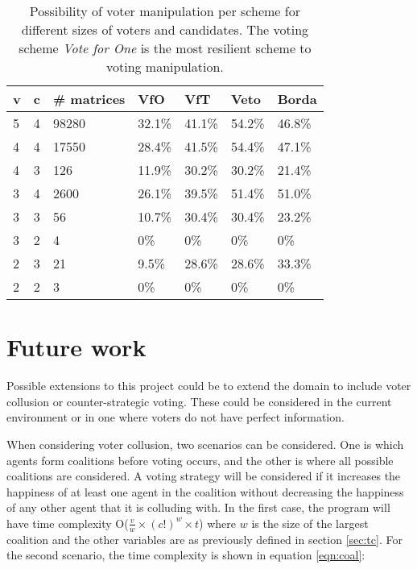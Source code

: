 \begin{table}[h]
\begin{tabular}{ll|lllll}
v & c  &  \# matrices & VfO  & VfT      & Veto   & Borda  \\
    \hline
5 & 4 & 98280 & 32.1\% & 41.1\% & 54.2\% & 46.8\% \\
4 & 4 & 17550 & 28.4\% & 41.5\% & 54.4\% & 47.1\% \\
4 & 3 & 126   & 11.9\% & 30.2\% & 30.2\% & 21.4\% \\
3 & 4 & 2600  & 26.1\% & 39.5\% & 51.4\% & 51.0\% \\
3 & 3 & 56    & 10.7\% & 30.4\% & 30.4\% & 23.2\% \\
3 & 2 & 4     & 0\%    & 0\%    & 0\%    & 0\%    \\
2 & 3 & 21    & 9.5\%  & 28.6\% & 28.6\% & 33.3\% \\
2 & 2 & 3     & 0\%    & 0\%    & 0\%    & 0\%   

\end{tabular}
\caption{Possibility of voter manipulation per scheme for different sizes of voters and candidates. The voting scheme \textit{Vote for One} is the most resilient scheme to voting manipulation.}
\label{tab:riskTable}
\end{table}


\section{Future work}
Possible extensions to this project could be to extend the domain to include voter collusion or counter-strategic voting. These could be considered in the current environment or in one where voters do not have perfect information.

When considering voter collusion, two scenarios can be considered. One is which agents form coalitions before voting occurs, and the other is where all possible coalitions are considered. A voting strategy will be considered if it increases the happiness of at least one agent in the coalition without decreasing the happiness of any other agent that it is colluding with. In the first case, the program will have time complexity O($\frac{v}{w} \times (c!)^w \times t$) where $w$ is the size of the largest coalition and the other variables are as previously defined in section \ref{sec:tc}. For the second scenario, the time complexity is shown in equation \ref{eqn:coal}:

